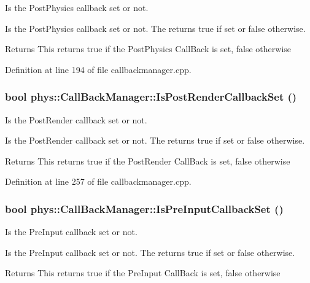 Is the PostPhysics callback set or not. 

Is the PostPhysics callback set or not. The returns true if set or false otherwise. \begin{DoxyReturn}{Returns}
This returns true if the PostPhysics CallBack is set, false otherwise 
\end{DoxyReturn}


Definition at line 194 of file callbackmanager.cpp.

\hypertarget{classphys_1_1CallBackManager_a13011f2f9ffd561255772bc4082b304f}{
\subsubsection[{IsPostRenderCallbackSet}]{\setlength{\rightskip}{0pt plus 5cm}bool phys::CallBackManager::IsPostRenderCallbackSet ()}}
\label{d1/d47/classphys_1_1CallBackManager_a13011f2f9ffd561255772bc4082b304f}


Is the PostRender callback set or not. 

Is the PostRender callback set or not. The returns true if set or false otherwise. \begin{DoxyReturn}{Returns}
This returns true if the PostRender CallBack is set, false otherwise 
\end{DoxyReturn}


Definition at line 257 of file callbackmanager.cpp.

\hypertarget{classphys_1_1CallBackManager_a1add8e6e7f5862ec4a4fe48095dc3c4e}{
\subsubsection[{IsPreInputCallbackSet}]{\setlength{\rightskip}{0pt plus 5cm}bool phys::CallBackManager::IsPreInputCallbackSet ()}}
\label{d1/d47/classphys_1_1CallBackManager_a1add8e6e7f5862ec4a4fe48095dc3c4e}


Is the PreInput callback set or not. 

Is the PreInput callback set or not. The returns true if set or false otherwise. \begin{DoxyReturn}{Returns}
This returns true if the PreInput CallBack is set, false otherwise 
\end{DoxyReturn}


